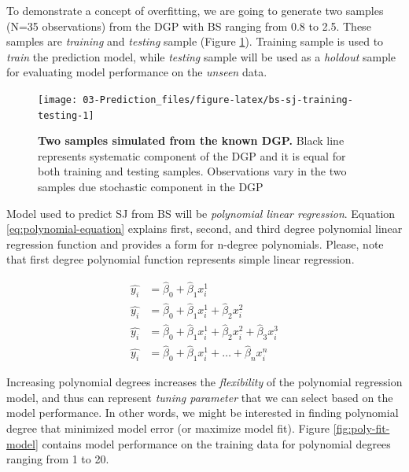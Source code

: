 \documentclass[
]{book}
\begin{document}
To demonstrate a concept of overfitting, we are going to generate two samples (N=35 observations) from the DGP with BS ranging from 0.8 to 2.5. These samples are \emph{training} and \emph{testing} sample (Figure \ref{fig:bs-sj-training-testing}). Training sample is used to \emph{train} the prediction model, while \emph{testing} sample will be used as a \emph{holdout} sample for evaluating model performance on the \emph{unseen} data.

\begin{figure}

{\centering \texttt{[image: 03-Prediction\_files/figure-latex/bs-sj-training-testing-1]} 

}

\caption{\textbf{Two samples simulated from the known DGP. }Black line represents systematic component of the DGP and it is equal for both training and testing samples. Observations vary in the two samples due stochastic component in the DGP}\label{fig:bs-sj-training-testing}
\end{figure}



Model used to predict SJ from BS will be \emph{polynomial linear regression}. Equation \eqref{eq:polynomial-equation} explains first, second, and third degree polynomial linear regression function and provides a form for n-degree polynomials. Please, note that first degree polynomial function represents simple linear regression.

\begin{equation}
  \begin{split}
    \hat{y_i} &= \hat{\beta}_0 + \hat{\beta}_1 x_i^1 \\
    \hat{y_i} &= \hat{\beta}_0 + \hat{\beta}_1 x_i^1 + \hat{\beta}_2 x_i^2 \\
    \hat{y_i} &= \hat{\beta}_0 + \hat{\beta}_1 x_i^1 + \hat{\beta}_2 x_i^2 + \hat{\beta}_3 x_i^3 \\
    \hat{y_i} &= \hat{\beta}_0 + \hat{\beta}_1 x_i^1 + \dots + \hat{\beta}_n x_i^n
  \end{split}
  \label{eq:polynomial-equation}
\end{equation}

Increasing polynomial degrees increases the \emph{flexibility} of the polynomial regression model, and thus can represent \emph{tuning parameter} that we can select based on the model performance. In other words, we might be interested in finding polynomial degree that minimized model error (or maximize model fit). Figure \ref{fig:poly-fit-model} contains model performance on the training data for polynomial degrees ranging from 1 to 20.
\end{document}

